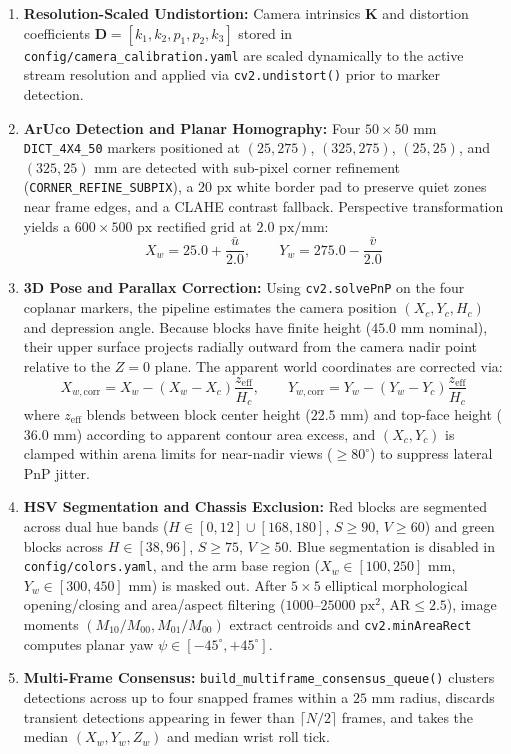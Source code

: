 \documentclass[11pt,a4paper]{article}
\begin{document}
\begin{enumerate}[leftmargin=1.5em]
  \item \textbf{Resolution-Scaled Undistortion:} Camera intrinsics $\mathbf{K}$ and distortion coefficients $\mathbf{D} = [k_1, k_2, p_1, p_2, k_3]$ stored in \texttt{config/\allowbreak camera\_\allowbreak calibration.yaml} are scaled dynamically to the active stream resolution and applied via \texttt{cv2.undistort()} prior to marker detection.
  \item \textbf{ArUco Detection and Planar Homography:} Four $50 \times 50\text{ mm}$ \texttt{DICT\_4X4\_50} markers positioned at $(25, 275)$, $(325, 275)$, $(25, 25)$, and $(325, 25)\text{ mm}$ are detected with sub-pixel corner refinement (\texttt{CORNER\_\allowbreak REFINE\_\allowbreak SUBPIX}), a $20\text{ px}$ white border pad to preserve quiet zones near frame edges, and a CLAHE contrast fallback. Perspective transformation yields a $600 \times 500\text{ px}$ rectified grid at $2.0\text{ px/mm}$:
  \begin{equation}
    X_w = 25.0 + \frac{\bar{u}}{2.0}, \qquad Y_w = 275.0 - \frac{\bar{v}}{2.0}
  \end{equation}
  \item \textbf{3D Pose and Parallax Correction:} Using \texttt{cv2.solvePnP} on the four coplanar markers, the pipeline estimates the camera position $(X_c, Y_c, H_c)$ and depression angle. Because blocks have finite height ($45.0\text{ mm}$ nominal), their upper surface projects radially outward from the camera nadir point relative to the $Z = 0$ plane. The apparent world coordinates are corrected via:
  \begin{equation}
    X_{w,\text{corr}} = X_w - (X_w - X_c)\frac{z_{\text{eff}}}{H_c}, \qquad
    Y_{w,\text{corr}} = Y_w - (Y_w - Y_c)\frac{z_{\text{eff}}}{H_c}
  \end{equation}
  where $z_{\text{eff}}$ blends between block center height ($22.5\text{ mm}$) and top-face height ($36.0\text{ mm}$) according to apparent contour area excess, and $(X_c, Y_c)$ is clamped within arena limits for near-nadir views ($\ge 80^\circ$) to suppress lateral PnP jitter.
  \item \textbf{HSV Segmentation and Chassis Exclusion:} Red blocks are segmented across dual hue bands ($H \in [0, 12] \cup [168, 180]$, $S \ge 90$, $V \ge 60$) and green blocks across $H \in [38, 96]$, $S \ge 75$, $V \ge 50$. Blue segmentation is disabled in \texttt{config/colors.yaml}, and the arm base region ($X_w \in [100, 250]\text{ mm}$, $Y_w \in [300, 450]\text{ mm}$) is masked out. After $5 \times 5$ elliptical morphological opening/closing and area/aspect filtering ($1000\text{--}25000\text{ px}^2$, $\text{AR} \le 2.5$), image moments $(M_{10}/M_{00}, M_{01}/M_{00})$ extract centroids and \texttt{cv2.minAreaRect} computes planar yaw $\psi \in [-45^\circ, +45^\circ]$.
  \item \textbf{Multi-Frame Consensus:} \texttt{build\_multiframe\_consensus\_queue()} clusters detections across up to four snapped frames within a $25\text{ mm}$ radius, discards transient detections appearing in fewer than $\lceil N/2 \rceil$ frames, and takes the median $(X_w, Y_w, Z_w)$ and median wrist roll tick.
\end{enumerate}
\end{document}
